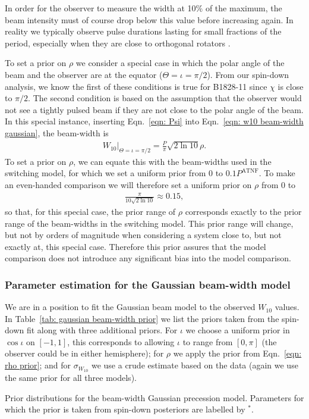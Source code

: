\documentclass[../full_thesis/full_thesis.tex]{subfiles}
\newcommand{\thisdir}{../comparing_periodic_modulations}
\newcommand{\PATNF}{P^{\mathrm{ATNF}}}
\begin{document}
In order for the observer to measure the width at 10\% of the maximum, the beam
intensity must of course drop below this value before increasing again. In
reality we typically observe pulse durations lasting for small fractions of the
period, especially when they are close to orthogonal rotators \citep{Lyne1988}.

To set a prior on $\rho$ we consider a special case in which the polar angle of
the beam and the observer are at the equator ($\Theta=\iota=\pi/2$). From our
spin-down analysis, we know the first of these conditions is true for B1828-11
since $\chi$ is close to $\pi/2$. The second condition is based on the assumption
that the observer would not see a tightly pulsed beam if they are not close to the
polar angle of the beam. In this special instance, inserting
Eqn.~\eqref{eqn: Psi} into Eqn.~\eqref{eqn: w10 beam-width gaussian}, the beam-width is
\begin{align}
W_{10} \bigg|_{\Theta=\iota=\pi/2} = \frac{P}{\pi}\sqrt{2\ln10} \rho.
\end{align}
To set a prior on $\rho$, we can equate this with the beam-widths used in the
switching model, for which we set a uniform prior from $0$ to $0.1\PATNF$.
To make an even-handed comparison we will therefore set a uniform prior on
$\rho$ from 0 to
\begin{align}
\frac{\pi}{10\sqrt{2\ln10}} \approx 0.15,
\label{eqn: rho prior}
\end{align}
so that, for this special case, the prior range of $\rho$ corresponds exactly
to the prior range of the beam-widths in the switching model.
This prior range will change, but not by orders of magnitude when
considering a system close to, but not exactly at, this special case. Therefore
this prior assures that the model comparison does not introduce any significant
bias into the model comparison.

\subsubsection{Parameter estimation for the Gaussian beam-width model}

We are in a position to fit the Gaussian beam model to the observed $W_{10}$
values. In Table~\ref{tab: gaussian beam-width prior} we list the priors taken
from the spin-down fit along with three additional priors. For $\iota$ we
choose a uniform prior in $\cos\iota$ on $[-1, 1]$, this corresponds to
allowing $\iota$ to range from $[0, \pi]$ (the observer could be in either
hemisphere); for $\rho$ we apply the prior from Eqn.~\eqref{eqn: rho
prior}; and for $\sigma_{W_{10}}$ we use a crude estimate based on the
data (again we use the same prior for all three models).
\begin{table}
\centering
\caption{Prior distributions for the beam-width Gaussian precession model. Parameters
for which the prior is taken from spin-down posteriors are labelled by $^{*}$.}
\label{tab: gaussian beam-width prior}

\end{table}
\end{document}

